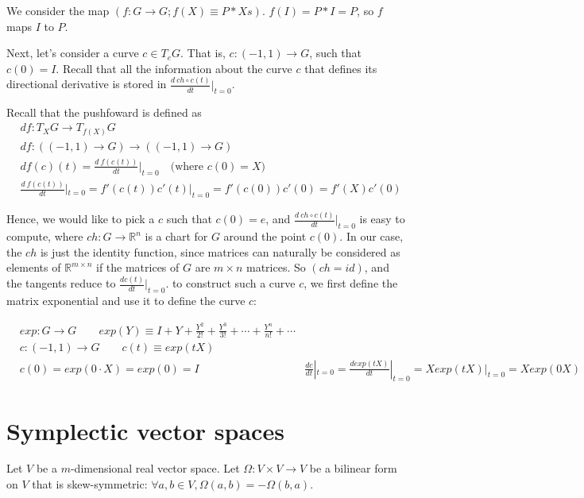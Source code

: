 \documentclass[11pt]{book}
\newcommand{\R}{\ensuremath{\mathbb R}}
\begin{document}
We consider the map $\left( f: G \rightarrow G; f(X) \equiv P * Xs \right)$. 
$f(I) = P * I = P$, so $f$ maps $I$ to $P$.

Next, let's consider a curve $c \in T_e G$. That is, $c: (-1, 1) \rightarrow G$, such that $c(0) = I$.
Recall that all the information about the curve $c$ that defines its directional
derivative is stored in $\frac{d~ch \circ c(t)}{dt}|_{t=0}$.

Recall that the pushfoward is defined as 
\begin{align*}
&df: T_X G \rightarrow T_{f(X)} G \\
&df: ((-1, 1) \rightarrow G) \rightarrow ((-1, 1) \rightarrow G)  \\
&df(c)(t) = \frac{d~f(c(t))}{dt}|_{t=0} \quad \text{(where $c(0) = X$)} \\
&\frac{d~f(c(t))}{dt}|_{t=0} = f'(c(t))c'(t)|_{t=0} = f'(c(0)) c'(0) = f'(X) c'(0)
\end{align*}

Hence, we would like to pick a $c$ such that $c(0) = e$,
and $\frac{d~ch \circ c(t)}{dt}|_{t=0}$ is easy to compute, where $ch: G \rightarrow \R^n$
is a chart for $G$ around the point $c(0)$.
In our case, the $ch$ is just the identity function, since matrices can naturally
be considered as elements of $\R^{m \times n}$ if the matrices of $G$ are $m \times n$
matrices. So $(ch = id)$, and  the tangents reduce to $\frac{dc(t)}{dt}|_{t=0}$.
to construct such a curve $c$, we first define the matrix exponential and use it to
define the curve $c$:

\begin{align*}
&exp: G \to G \qquad exp(Y) \equiv I + Y + \frac{Y^2}{2!} + \frac{Y^3}{3!} + \cdots + \frac{Y^n}{n!} + \cdots \\
&c: (-1, 1) \rightarrow G \qquad c(t) \equiv exp(tX) \\
&c(0) = exp(0 \cdot X) = exp(0) = I 
&\frac{dc}{dt}|_{t=0} = \frac{d exp(tX)}{dt}|_{t=0} = X exp(tX)|_{t=0} = X exp(0X)
\end{align*}

\chapter{Symplectic vector spaces}


Let $V$ be a $m$-dimensional real vector space. Let $\Omega: V \times V \rightarrow V$
be a bilinear form on $V$ that is skew-symmetric:
$\forall a, b \in V, \Omega(a, b) = -\Omega(b, a)$.
\end{document}
